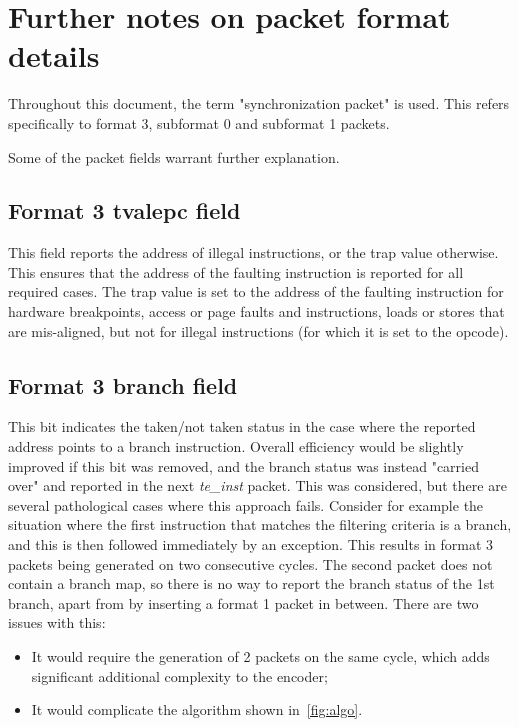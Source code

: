 \section {Further notes on packet format details}

Throughout this document, the term "synchronization packet" is used.  This refers specifically to format 3, 
subformat 0 and subformat 1 packets.

Some of the packet fields warrant further explanation.

\subsection{Format 3 \textbf{tvalepc} field}

This field reports the address of illegal instructions, or the trap value otherwise.  This ensures that
the address of the faulting instruction is reported for all required cases.  The trap value 
is set to the address of the faulting instruction for hardware breakpoints, access or page faults and 
instructions, loads or stores that are mis-aligned, but not for illegal instructions (for which it is set to the opcode).

\subsection{Format 3 \textbf{branch} field}

This bit indicates the taken/not taken status in the case where the reported address points to a branch instruction.
Overall efficiency would be slightly improved if this bit was removed, and the branch status was instead 
"carried over" and reported in the next \textit{te\_inst} packet.  This was considered, but there are several
pathological cases where this approach fails.  Consider for example the situation where the first instruction
that matches the filtering criteria is a branch, and this is then followed immediately by an exception.  This
results in format 3 packets being generated on two consecutive cycles.  The second packet does not contain a branch
map, so there is no way to report the branch status of the 1st branch, apart from by inserting a format 1 packet in 
between.  There are two issues with this:

\begin{itemize}
  \item It would require the generation of 2 packets on the same cycle, which adds significant additional complexity
    to the encoder;
  \item It would complicate the algorithm shown in~\ref{fig:algo}. 
\end{itemize}


